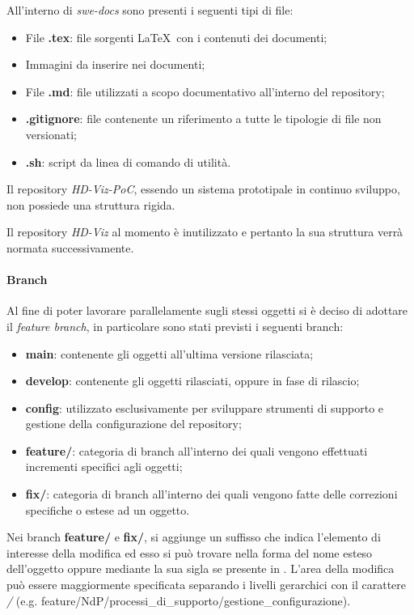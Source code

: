 All'interno di \emph{swe-docs} sono presenti i seguenti tipi di file:
\begin{itemize}
    \item File \textbf{.tex}: file sorgenti \LaTeX\ con i contenuti dei documenti;
    \item Immagini da inserire nei documenti;
    \item File \textbf{.md}: file utilizzati a scopo documentativo all'interno del repository;
    \item \textbf{.gitignore}: file contenente un riferimento a tutte le tipologie di file non versionati;
    \item \textbf{.sh}: script da linea di comando di utilità.
\end{itemize}


Il repository \emph{HD-Viz-PoC}, essendo un sistema prototipale in continuo sviluppo, non possiede una struttura rigida.

Il repository \emph{HD-Viz} al momento è inutilizzato e pertanto la sua struttura verrà normata successivamente.
%

\paragraph{Branch}
\label{par:gestione_configurazione:branching}

Al fine di poter lavorare parallelamente sugli stessi oggetti si è deciso di adottare il  \emph{feature branch}, in
particolare sono stati previsti i seguenti branch:
\begin{itemize}
	\item \textbf{main}: contenente gli oggetti all'ultima versione rilasciata;
	\item \textbf{develop}: contenente gli oggetti rilasciati, oppure in fase di rilascio;
	\item \textbf{config}: utilizzato esclusivamente per sviluppare strumenti di supporto e gestione della configurazione del repository;
	\item \textbf{feature/}: categoria di branch all'interno dei quali vengono effettuati incrementi specifici agli oggetti;
	\item \textbf{fix/}: categoria di branch all'interno dei quali vengono fatte delle correzioni specifiche o estese ad un oggetto.
\end{itemize}
Nei branch \textbf{feature/} e \textbf{fix/}, si aggiunge un suffisso che indica l'elemento di interesse della modifica ed esso si può trovare
nella forma del nome esteso dell'oggetto oppure mediante la sua sigla se presente in . L'area della modifica può essere
maggiormente specificata separando i livelli gerarchici con il carattere \emph{/} (e.g. feature/NdP/processi\_di\_supporto/gestione\_configurazione).

